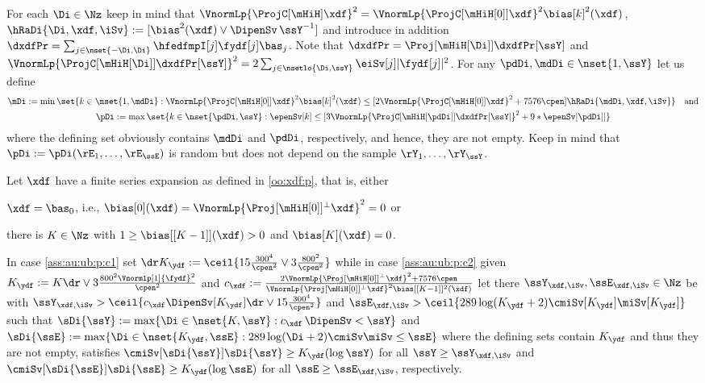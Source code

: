 \begin{te}
For each $\Di\in\Nz$ keep in mind that
$\VnormLp{\ProjC[{\mHiH}]\xdf}^2=\VnormLp{\ProjC[{\mHiH[0]}]\xdf}^2\bias[k]^2(\xdf)$,  
$\hRaDi{\Di,\xdf,\iSv}:=[\bias^2(\xdf)\vee \DipenSv\,\ssY^{-1}]$
and
introduce in addition
$\dxdfPr=\sum_{j\in\nset{-\Di,\Di}}\hfedfmpI[j]\fydf[j]\bas_j$. Note
that  $\dxdfPr=\Proj[{\mHiH[\Di]}]\dxdfPr[\ssY]$
and $\VnormLp{\ProjC[{\mHiH[\Di]}]\dxdfPr[\ssY]}^2=2\sum_{j\in\nsetlo{\Di,\ssY}}\eiSv[j]|\fydf[j]|^2$. For any $\pdDi,\mdDi\in\nset{1,\ssY}$ let us define 
\begin{multline}\label{de:au:*Di}
\mDi:=\min\set{k\in\nset{1,\mdDi}: \VnormLp{\ProjC[{\mHiH[0]}]\xdf}^2\bias[k]^2(\xdf)\leq
  [2\VnormLp{\ProjC[{\mHiH[0]}]\xdf}^2+7576\cpen]\hRaDi{\mdDi,\xdf,\iSv}}\quad\text{and}\\\pDi:=\max\set{k\in\nset{\pdDi,\ssY}:
   \epenSv[k] \leq [3\VnormLp{\ProjC[{\mHiH[\pdDi]}]\dxdfPr[\ssY]}^2+9*\epenSv[\pdDi]]}
\end{multline}
where  the defining set obviously contains $\mdDi$ and $\pdDi$, respectively, 
and hence, they are
not empty. Keep in mind that $\pDi:=\pDi(\rE_1,\dotsc,\rE_{\ssE})$ is
random but does not depend on the sample $\rY_1,\dotsc,\rY_{\ssY}$.
\end{te}

\begin{as}\label{ass:au:ub:p}
Let $\xdf$ have a finite series expansion as defined in \ref{oo:xdf:p}, that is, either
\begin{inparaenum}[i]
\renewcommand{\theenumi}{\dgrau\rm(\alph{enumi})}
\item\label{ass:au:ub:p:c1} $\xdf=\bas_0$, i.e., $\bias[0](\xdf)=\VnormLp{\Proj[{\mHiH[0]}]^\perp\xdf}^2=0$ or
\item\label{ass:au:ub:p:c2} there is $K\in\Nz$ with $1\geq \bias[{[K-1] }](\xdf)>0$ and $\bias[K](\xdf)=0$.
\end{inparaenum}
In case \ref{ass:au:ub:p:c1} set $\dr K_{\ydf}:=\ceil{15\tfrac{300^4}{\cpen^2}\vee3\tfrac{800^2}{\cpen^2}}$ while in case \ref{ass:au:ub:p:c2} given $K_{\ydf}:=K\dr\vee
3\tfrac{800^2\Vnormlp[1]{\fydf}^2}{\cpen^2}$ and $c_{\xdf}:=\tfrac{2\VnormLp{\Proj[{\mHiH[0]}]^\perp\xdf}^2+7576\cpen}{\VnormLp{\Proj[{\mHiH[0]}]^\perp\xdf}^2\bias[{[K-1]}]^2(\xdf)}$ let there $\ssY_{\xdf,\iSv},\ssE_{\xdf,\iSv}\in\Nz$ be with $\ssY_{\xdf,\iSv}>\ceil{c_{\xdf}\DipenSv[K_{\ydf}]\dr\vee15\tfrac{300^4}{\cpen^2}}$ and $\ssE_{\xdf,\iSv}>\ceil{289\log(K_{\ydf}+2)\cmiSv[K_{\ydf}]\miSv[K_{\ydf}]}$ such that $\sDi{\ssY}:=\max\{\Di\in\nset{K,\ssY}:c_{\xdf}\,\DipenSv<\ssY\}$ and $\sDi{\ssE}:=\max\{\Di\in\nset{K_{\ydf},\ssE}:289\log(\Di+2)\cmiSv\miSv\leq\ssE\}$ where the defining sets contain $K_{\ydf}$ and thus they are not empty, satisfies $\cmiSv[\sDi{\ssY}]\sDi{\ssY}\geq K_{\ydf}(\log\ssY)$ for all $\ssY\geq \ssY_{\xdf,\iSv}$ and $\cmiSv[\sDi{\ssE}]\sDi{\ssE}\geq K_{\ydf}(\log\ssE)$ for all $\ssE\geq \ssE_{\xdf,\iSv}$, respectively.
\end{as}

